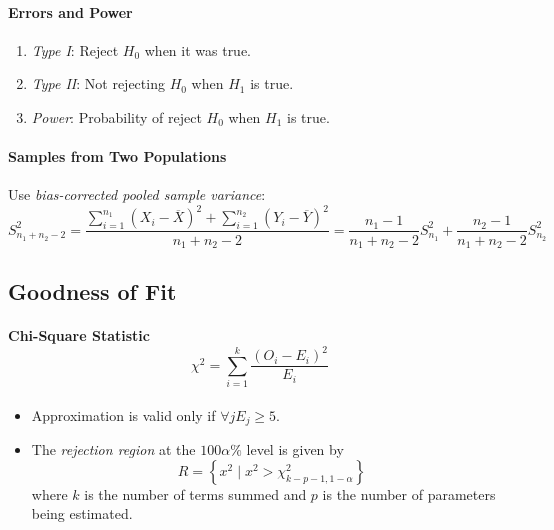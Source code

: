 \documentclass[twocolumn,english]{article}
\begin{document}
\paragraph{Errors and Power}
\begin{enumerate}
\item \emph{Type I}: Reject $H_{0}$ when it was true.
\item \emph{Type II}: Not rejecting $H_{0}$ when $H_{1}$ is true.
\item \emph{Power}: Probability of reject $H_{0}$ when $H_{1}$ is true.
\end{enumerate}

\paragraph{Samples from Two Populations}

Use \emph{bias-corrected pooled sample variance}:
\[
S_{n_{1}+n_{2}-2}^{2}=\frac{\sum_{i=1}^{n_{1}}\left(X_{i}-\overline{X}\right)^{2}+\sum_{i=1}^{n_{2}}\left(Y_{i}-\overline{Y}\right)^{2}}{n_{1}+n_{2}-2}=\frac{n_{1}-1}{n_{1}+n_{2}-2}S_{n_{1}}^{2}+\frac{n_{2}-1}{n_{1}+n_{2}-2}S_{n_{2}}^{2}
\]

\subsection{Goodness of Fit}

\paragraph{Chi-Square Statistic
\[
\chi^{2}=\sum_{i=1}^{k}\frac{\left(O_{i}-E_{i}\right)^{2}}{E_{i}}
\]
}
\begin{itemize}
\item Approximation is valid only if $\forall jE_{j}\geq5$.
\item The \emph{rejection region} at the $100\alpha\%$ level is given by
\[
R=\left\{ x^{2}\mid x^{2}>\chi_{k-p-1,1-\alpha}^{2}\right\} 
\]
where $k$ is the number of terms summed and $p$ is the number of
parameters being estimated.
\end{itemize}
\end{document}
